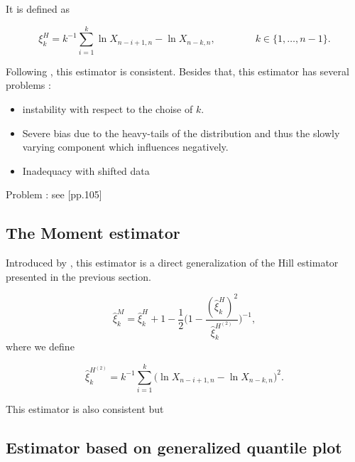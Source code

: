 \documentclass[11pt,a4paper,openany ]{book}
\begin{document}


It is defined as 

\begin{equation}
\xi^H_{k}=k^{-1}\sum_{i=1}^k\ln X_{n-i+1,n}-\ln X_{n-k,n}, \qquad\qquad k\in\{1,\dots,n-1\}.
\end{equation}



Following \cite{mason_}, this estimator is consistent. Besides that, this estimator has several problems : 

\begin{itemize}
	\item instability with respect to the choise of $k$.
	\item Severe bias due to the heavy-tails of the distribution and thus the slowly varying component which influences negatively.
	\item Inadequacy with shifted data
\end{itemize}


Problem : see [pp.105]


\subsection*{The Moment estimator}

Introduced by \cite{dekkers_moment_1989}, this estimator is a direct generalization of the Hill estimator presented in the previous section. 

\begin{equation}
\hat{\xi}^M_k=\hat{\xi}_k^H+1-\frac{1}{2}\Bigg(1-\frac{(\hat{\xi}_k^H)^2}{\hat{\xi}^{H^{(2)}}_k }\Bigg)^{-1},
\end{equation}
where we define 

\begin{equation*}
\hat{\xi}^{H^{(2)}}_k=k^{-1}\sum_{i=1}^k\big(\ln X_{n-i+1,n}-\ln X_{n-k,n}\big)^2.
\end{equation*}


This estimator is also consistent but  


\subsection*{Estimator based on generalized quantile plot}
\end{document}
